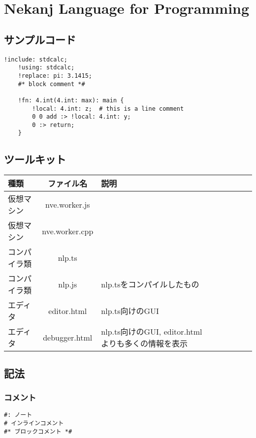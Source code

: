 \section{Nekanj Language for Programming}
\subsection{サンプルコード}
\begin{lstlisting}[]
    !include: stdcalc;
    !using: stdcalc;
    !replace: pi: 3.1415;
    #* block comment *#

    !fn: 4.int(4.int: max): main {
        !local: 4.int: z;  # this is a line comment
        0 0 add :> !local: 4.int: y;
        0 :> return;
    }
\end{lstlisting}

\subsection{ツールキット}

\begin{table}[h]
    \centering
    \begin{tabular}{lcllllll}
        \hline
        種類 & ファイル名 & 説明 \\
        \hline \hline
        仮想マシン & nve.worker.js \\
        仮想マシン & nve.worker.cpp \\
        \hline
        コンパイラ類 & nlp.ts \\
        コンパイラ類 & nlp.js & nlp.tsをコンパイルしたもの \\
        \hline
        エディタ & editor.html & nlp.ts向けのGUI \\
        エディタ & debugger.html & nlp.ts向けのGUI, editor.htmlよりも多くの情報を表示 \\
        \hline
    \end{tabular}
\end{table}


\subsection{記法}

\subsubsection{コメント}
\begin{lstlisting}[]
#: ノート
# インラインコメント
#* ブロックコメント *#
\end{lstlisting}

